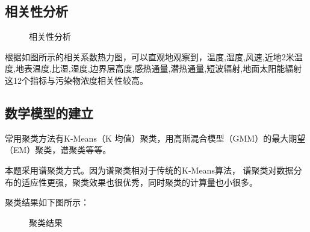 \documentclass[a4paper,10pt]{my_paper}
\numberwithin{equation}{section}
\begin{document}
\subsection{相关性分析}
\begin{figure}[htbp]
  \caption{相关性分析}\label{fig_相关性分析}
\end{figure}

根据如图所示的相关系数热力图，可以直观地观察到，温度,湿度,风速,近地2米温度,地表温度,比湿,湿度,边界层高度,感热通量,潜热通量,短波辐射,地面太阳能辐射这12个指标与污染物浓度相关性较高。

\subsection{数学模型的建立}
常用聚类方法有K-Means（K 均值）聚类，用高斯混合模型（GMM）的最大期望（EM）聚类，谱聚类等等。

本题采用谱聚类方式。因为谱聚类相对于传统的K-Means算法， 谱聚类对数据分布的适应性更强，聚类效果也很优秀，同时聚类的计算量也小很多。

聚类结果如下图所示：

\begin{figure}[htbp]
    \caption{聚类结果}\label{fig_聚类结果}
\end{figure}
\end{document}
